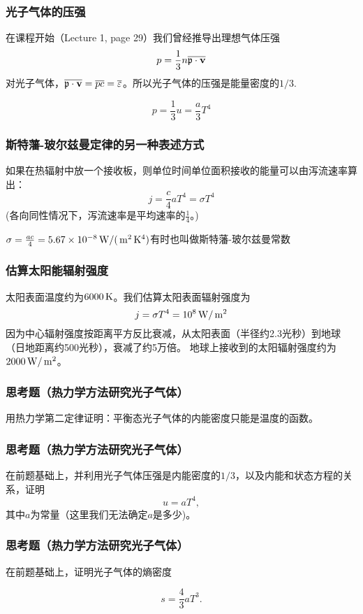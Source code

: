 \documentclass[CJK,14pt]{beamer}
\begin{document}
\begin{frame}
  \frametitle{光子气体的压强}
  在课程开始（Lecture 1, page 29）我们曾经推导出理想气体压强
  $$ p = \frac{1}{3} n \overline{{\mathfrak{p}} \cdot {\mathbf{v}}} $$
  对光子气体，$\overline{{\mathfrak{p}} \cdot {\mathbf{v}}} = \overline{pc} = \overline{\varepsilon}$。所以{\blue 光子气体的压强是能量密度的$1/3$.}

  $$p = \frac{1}{3}u = \frac{a}{3} T^4$$

\end{frame}


\begin{frame}
\frametitle{斯特藩-玻尔兹曼定律的另一种表述方式}

如果在热辐射中放一个接收板，则单位时间单位面积接收的能量可以由泻流速率算出：
$$j = \frac{c}{4}aT^4 = \sigma T^4 $$
{\small (各向同性情况下，泻流速率是平均速率的$\frac{1}{4}$。)}

$\sigma = \frac{ac}{4} = 5.67 \times 10^{-8} \,\mathrm{W}/(\,\mathrm{m}^2 \,\mathrm{K}^4)$有时也叫做斯特藩-玻尔兹曼常数\wulian

\end{frame}

\begin{frame}
\frametitle{估算太阳能辐射强度}

太阳表面温度约为$6000\,\mathrm{K}$。我们估算太阳表面辐射强度为
$$j = \sigma T^4 = 10^8 \,\mathrm{W}/\,\mathrm{m}^2 $$
因为中心辐射强度按距离平方反比衰减，从太阳表面（半径约2.3光秒）到地球（日地距离约500光秒），衰减了约5万倍。
地球上接收到的太阳辐射强度约为$2000\,\mathrm{W}/\,\mathrm{m}^2$。


\end{frame}


\begin{frame}
  \frametitle{思考题（热力学方法研究光子气体）}

  用热力学第二定律证明：平衡态光子气体的内能密度只能是温度的函数。
\end{frame}


\begin{frame}
  \frametitle{思考题（热力学方法研究光子气体）}


  在前题基础上，并利用光子气体压强是内能密度的$1/3$，以及内能和状态方程的关系，证明
  $$ u = a T^4,$$
  其中$a$为常量（这里我们无法确定$a$是多少)。
\end{frame}


\begin{frame}
  \frametitle{思考题（热力学方法研究光子气体）}


  在前题基础上，证明光子气体的熵密度

  $$ s = \frac{4}{3} aT^3.$$

\end{frame}
\end{document}
